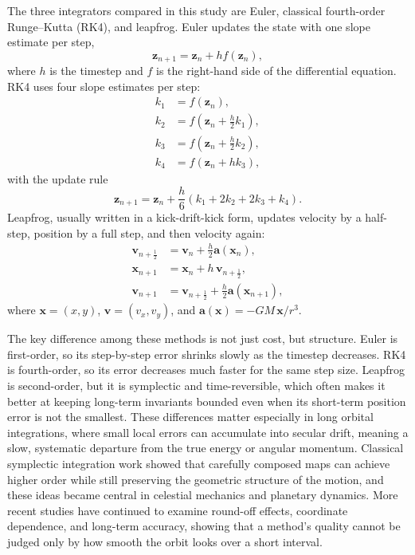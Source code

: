 \documentclass[12pt]{article}
\begin{document}
The three integrators compared in this study are Euler, classical fourth-order Runge--Kutta (RK4), and leapfrog. Euler updates the state with one slope estimate per step,
\begin{equation}
    \mathbf{z}_{n+1} = \mathbf{z}_n + h f(\mathbf{z}_n),
\end{equation}
where $h$ is the timestep and $f$ is the right-hand side of the differential equation. RK4 uses four slope estimates per step:
\begin{align}
    k_1 &= f(\mathbf{z}_n), \\
    k_2 &= f\!\left(\mathbf{z}_n + \frac{h}{2}k_1\right), \\
    k_3 &= f\!\left(\mathbf{z}_n + \frac{h}{2}k_2\right), \\
    k_4 &= f\!\left(\mathbf{z}_n + h k_3\right),
\end{align}
with the update rule
\begin{equation}
    \mathbf{z}_{n+1} = \mathbf{z}_n + \frac{h}{6}(k_1 + 2k_2 + 2k_3 + k_4).
\end{equation}
Leapfrog, usually written in a kick-drift-kick form, updates velocity by a half-step, position by a full step, and then velocity again:
\begin{align}
    \mathbf{v}_{n+\frac{1}{2}} &= \mathbf{v}_n + \frac{h}{2}\mathbf{a}(\mathbf{x}_n), \\
    \mathbf{x}_{n+1} &= \mathbf{x}_n + h\,\mathbf{v}_{n+\frac{1}{2}}, \\
    \mathbf{v}_{n+1} &= \mathbf{v}_{n+\frac{1}{2}} + \frac{h}{2}\mathbf{a}(\mathbf{x}_{n+1}),
\end{align}
where $\mathbf{x} = (x,y)$, $\mathbf{v} = (v_x,v_y)$, and $\mathbf{a}(\mathbf{x}) = -GM\,\mathbf{x}/r^3$.

The key difference among these methods is not just cost, but structure. Euler is first-order, so its step-by-step error shrinks slowly as the timestep decreases. RK4 is fourth-order, so its error decreases much faster for the same step size. Leapfrog is second-order, but it is symplectic and time-reversible, which often makes it better at keeping long-term invariants bounded even when its short-term position error is not the smallest\supercite{hairer2006,leimkuhler2004,butcher1996}. These differences matter especially in long orbital integrations, where small local errors can accumulate into secular drift, meaning a slow, systematic departure from the true energy or angular momentum. Classical symplectic integration work showed that carefully composed maps can achieve higher order while still preserving the geometric structure of the motion, and these ideas became central in celestial mechanics and planetary dynamics\supercite{ruth1983,forest1990,yoshida1990,wisdom1991}. More recent studies have continued to examine round-off effects, coordinate dependence, and long-term accuracy, showing that a method's quality cannot be judged only by how smooth the orbit looks over a short interval\supercite{chambers2019,rein2019}.
\end{document}
